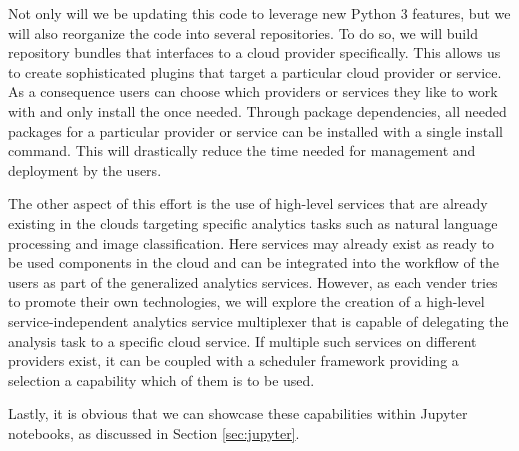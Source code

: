Not only will we be updating this code to leverage new
Python 3 features, but we will also reorganize the code into several
repositories. To do so, we will build repository bundles that
interfaces to a cloud provider specifically. This allows us to create
sophisticated plugins that target a particular cloud provider or
service. As a consequence users can choose which providers or services
they like to work with and only install the once needed. Through
package dependencies, all needed packages for a particular provider or
service can be installed with a single install command.  This will
drastically reduce the time needed for management and deployment by
the users.

The other aspect of this effort is the use of high-level services that
are already existing in the clouds targeting specific analytics tasks
such as natural language processing and image classification. Here
services may already exist as ready to be used components in the cloud
and can be integrated into the workflow of the users as part of the
generalized analytics services. However, as each vender tries to
promote their own technologies, we will explore the creation of a
high-level service-independent analytics service multiplexer that is
capable of delegating the analysis task to a specific cloud
service. If multiple such services on different providers exist, it
can be coupled with a scheduler framework providing a selection a
capability which of them is to be used.

Lastly, it is obvious that we can showcase these capabilities within
Jupyter notebooks, as discussed in Section \ref{sec:jupyter}.

